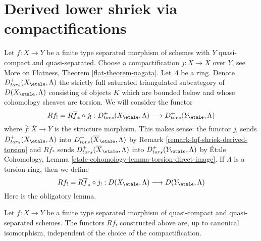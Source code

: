 \section{Derived lower shriek via compactifications}
\label{section-derived-lower-shriek-compactification}

\noindent
Let $f : X \to Y$ be a finite type separated morphism of schemes
with $Y$ quasi-compact and quasi-separated. Choose a compactification
$j : X \to \overline{X}$ over $Y$, see
More on Flatness, Theorem \ref{flat-theorem-nagata}.
Let $\Lambda$ be a ring. Denote $D^+_{tors}(X_\etale, \Lambda)$
the strictly full saturated triangulated subcategory of
$D(X_\etale, \Lambda)$ consisting of objects $K$ which are bounded below
and whose cohomology sheaves are torsion. We will consider the
functor
$$
Rf_! = R\overline{f}_* \circ j_! :
D^+_{tors}(X_\etale, \Lambda)
\longrightarrow
D^+_{tors}(Y_\etale, \Lambda)
$$
where $\overline{f} : \overline{X} \to Y$ is the structure morphism.
This makes sense: the functor $j_!$ sends $D^+_{tors}(X_\etale, \Lambda)$ into
$D^+_{tors}(\overline{X}_\etale, \Lambda)$ by
Remark \ref{remark-lqf-shriek-derived-torsion} and $R\overline{f}_*$ sends
$D^+_{tors}(\overline{X}_\etale, \Lambda)$ into $D^+_{tors}(Y_\etale, \Lambda)$
by \'Etale Cohomology, Lemma \ref{etale-cohomology-lemma-torsion-direct-image}.
If $\Lambda$ is a torsion ring, then we define
$$
Rf_! = R\overline{f}_* \circ j_! :
D(X_\etale, \Lambda)
\longrightarrow
D(Y_\etale, \Lambda)
$$
Here is the obligatory lemma.

\begin{lemma}
\label{lemma-shriek-well-defined}
Let $f : X \to Y$ be a finite type separated morphism of quasi-compact
and quasi-separated schemes. The functors $Rf_!$ constructed above
are, up to canonical isomorphism, independent of the choice of the
compactification.
\end{lemma}

